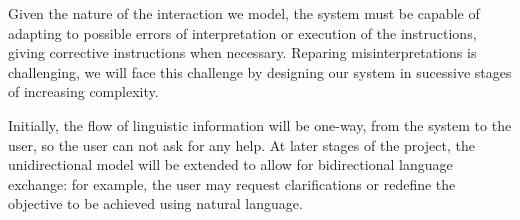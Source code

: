 
% 

Given the nature of the interaction we model, the system must
be capable of adapting to possible errors of interpretation
or execution of the instructions, giving corrective instructions when necessary.
Reparing misinterpretations is challenging, we will face this challenge by
designing our system in sucessive stages of increasing complexity.


Initially, the flow of linguistic information will be one-way, from the
system to the user, so the user can not ask for any help. At later stages of the
project, the unidirectional model will be extended to allow for bidirectional
language exchange: for example, the user may request clarifications or redefine
the objective to be achieved using natural language.


